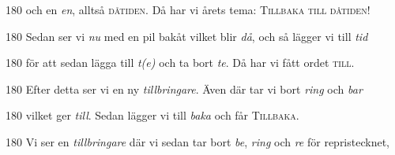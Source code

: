 \begin{flushright}

\begin{turn}{180}
och en \textit{en}, alltså \textsc{dåtiden}. Då har vi årets tema: \textsc{Tillbaka till dåtiden}!
\end{turn}

\begin{turn}{180}
Sedan ser vi \textit{nu} med en pil bakåt vilket blir \textit{då}, och så lägger vi till \textit{tid} 
\end{turn}

\begin{turn}{180}
för att sedan lägga till \textit{t(e)} och ta bort \textit{te}. Då har vi fått ordet \textsc{till}.
\end{turn}

\begin{turn}{180}
Efter detta ser vi en ny \textit{tillbringare}. Även där tar vi bort \textit{ring} och \textit{bar} 
\end{turn}

\begin{turn}{180}
 vilket ger \textit{till}. Sedan lägger vi till \textit{baka} och får \textsc{Tillbaka}. 
\end{turn}

\begin{turn}{180} 
Vi ser en \textit{tillbringare} där vi sedan tar bort \textit{be}, \textit{ring} och \textit{re }för repristecknet,
\end{turn}

\end{flushright}
